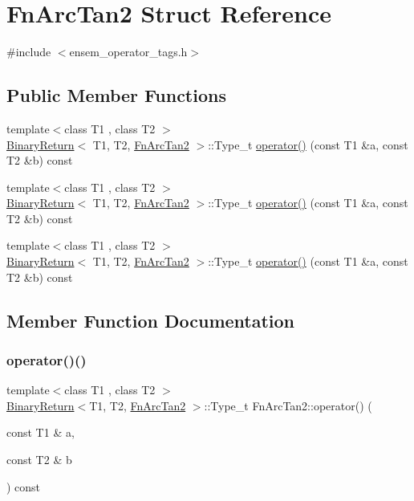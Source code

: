 \hypertarget{structFnArcTan2}{}\section{Fn\+Arc\+Tan2 Struct Reference}
\label{structFnArcTan2}


{\ttfamily \#include $<$ensem\+\_\+operator\+\_\+tags.\+h$>$}

\subsection*{Public Member Functions}
\begin{DoxyCompactItemize}
\item 
{\footnotesize template$<$class T1 , class T2 $>$ }\\\mbox{\hyperlink{structBinaryReturn}{Binary\+Return}}$<$ T1, T2, \mbox{\hyperlink{structFnArcTan2}{Fn\+Arc\+Tan2}} $>$\+::Type\+\_\+t \mbox{\hyperlink{structFnArcTan2_a919de5b0c020758f5280cc89b30e6133}{operator()}} (const T1 \&a, const T2 \&b) const
\item 
{\footnotesize template$<$class T1 , class T2 $>$ }\\\mbox{\hyperlink{structBinaryReturn}{Binary\+Return}}$<$ T1, T2, \mbox{\hyperlink{structFnArcTan2}{Fn\+Arc\+Tan2}} $>$\+::Type\+\_\+t \mbox{\hyperlink{structFnArcTan2_a919de5b0c020758f5280cc89b30e6133}{operator()}} (const T1 \&a, const T2 \&b) const
\item 
{\footnotesize template$<$class T1 , class T2 $>$ }\\\mbox{\hyperlink{structBinaryReturn}{Binary\+Return}}$<$ T1, T2, \mbox{\hyperlink{structFnArcTan2}{Fn\+Arc\+Tan2}} $>$\+::Type\+\_\+t \mbox{\hyperlink{structFnArcTan2_a919de5b0c020758f5280cc89b30e6133}{operator()}} (const T1 \&a, const T2 \&b) const
\end{DoxyCompactItemize}


\subsection{Member Function Documentation}
\mbox{\label{structFnArcTan2_a919de5b0c020758f5280cc89b30e6133}} 
\subsubsection{\texorpdfstring{operator()()}{operator()()}\hspace{0.1cm}{\footnotesize\ttfamily [1/3]}}
{\footnotesize\ttfamily template$<$class T1 , class T2 $>$ \\
\mbox{\hyperlink{structBinaryReturn}{Binary\+Return}}$<$T1, T2, \mbox{\hyperlink{structFnArcTan2}{Fn\+Arc\+Tan2}} $>$\+::Type\+\_\+t Fn\+Arc\+Tan2\+::operator() (\begin{DoxyParamCaption}\item[{const T1 \&}]{a,  }\item[{const T2 \&}]{b }\end{DoxyParamCaption}) const\hspace{0.3cm}{\ttfamily [inline]}}

